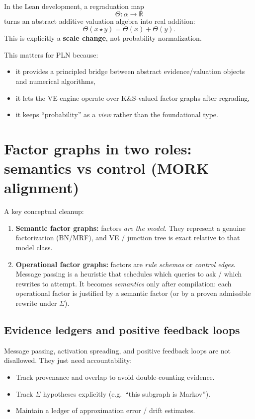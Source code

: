 \documentclass[11pt]{article}
\begin{document}
In the Lean development, a regraduation map
\[
  \Theta : \alpha \to \mathbb{R}
\]
turns an abstract additive valuation algebra into real addition:
\[
  \Theta(x \star y) = \Theta(x) + \Theta(y).
\]
This is explicitly a \textbf{scale change}, not probability normalization.

This matters for PLN because:
\begin{itemize}[leftmargin=2em]
\item it provides a principled bridge between abstract evidence/valuation objects and numerical algorithms,
\item it lets the VE engine operate over K\&S-valued factor graphs after regrading,
\item it keeps ``probability'' as a \emph{view} rather than the foundational type.
\end{itemize}

\section{Factor graphs in two roles: semantics vs control (MORK alignment)}

A key conceptual cleanup:

\begin{enumerate}[leftmargin=2em]
\item \textbf{Semantic factor graphs:} factors \emph{are the model}.
They represent a genuine factorization (BN/MRF), and VE / junction tree is exact
relative to that model class.
\item \textbf{Operational factor graphs:} factors are \emph{rule schemas} or \emph{control edges}.
Message passing is a heuristic that schedules which queries to ask / which rewrites to attempt.
It becomes \emph{semantics} only after compilation: each operational factor is justified by
a semantic factor (or by a proven admissible rewrite under $\Sigma$).
\end{enumerate}

\subsection{Evidence ledgers and positive feedback loops}

Message passing, activation spreading, and positive feedback loops are not disallowed.
They just need accountability:

\begin{itemize}[leftmargin=2em]
\item Track provenance and overlap to avoid double-counting evidence.
\item Track $\Sigma$ hypotheses explicitly (e.g.\ ``this subgraph is Markov'').
\item Maintain a ledger of approximation error / drift estimates.
\end{itemize}
\end{document}

